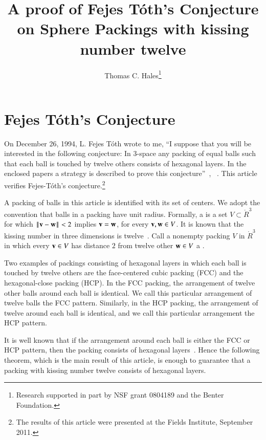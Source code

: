\documentclass{llncs}
\begin{document}
\title{A proof of Fejes T\'oth's  Conjecture on Sphere Packings with
kissing number twelve}
\author{Thomas C. Hales\thanks{{Research supported in part by 
NSF grant 0804189 and the Benter Foundation.}}}
\maketitle


\section{Fejes T\'oth's Conjecture}


On December 26, 1994, L. Fejes T\'oth wrote to me, ``I suppose that
you will be interested in the following conjecture: In $3$-space any
packing of equal balls such that each ball is touched by twelve others
consists of hexagonal layers.  In the enclosed papers a strategy is
described to prove this conjecture''~\cite{Fejes-Toth:89},
~\cite{Fejes-Toth:69}.  This article verifies Fejes-T\'oth's
conjecture.\footnote{The results of this article were presented at the
  Fields Institute, September 2011.}


A packing of balls in this article is identified with its set of
centers.  We adopt the convention that balls in a packing have unit
radius.  Formally, a  is a set $V\subset\ring{R}^3$
for which $\norm{\v}{\w} < 2$ implies ${\mathbf v}={\mathbf w}$,
for every ${\mathbf v},{\mathbf w}\in V$.  It is known that the kissing number
in three dimensions is twelve~\cite{Leech:1956:MG}.  Call a nonempty
packing $V$ in $\ring{R}^3$ in which every ${\mathbf v}\in V$ has distance $2$
from twelve other ${\mathbf w}\in V$ a .  

Two examples of packings consisting of hexagonal layers in which each
ball is touched by twelve others are the face-centered cubic packing
(FCC) and the hexagonal-close packing (HCP).  In the FCC packing, the
arrangement of twelve other balls around each ball is identical.  We
call this particular arrangement of twelve balls the FCC pattern.
Similarly, in the HCP packing, the arrangement of twelve around each
ball is identical, and we call this particular arrangement the HCP
pattern.

It is well known that if the arrangement around each ball is either
the FCC or HCP pattern, then the packing consists of hexagonal
layers~\cite[Sec.~1.3]{DSP}.  Hence the following theorem, which is
the main result of this article, is enough to guarantee that a packing
with kissing number twelve consists of hexagonal layers.
\end{document}
